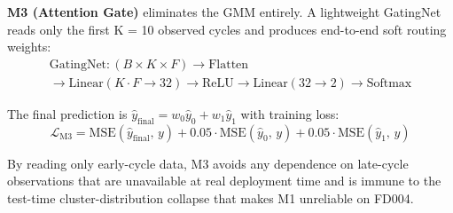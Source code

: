 \documentclass[review,12pt]{elsarticle}
\begin{document}
\textbf{M3 (Attention Gate)} eliminates the GMM entirely. A lightweight GatingNet reads only the first K = 10 observed cycles and produces end-to-end soft routing weights:
\begin{multline}
\text{GatingNet}: (B \times K \times F) \to \text{Flatten} \\
\to \text{Linear}(K{\cdot}F \to 32) \to \text{ReLU} \to \text{Linear}(32 \to 2) \to \text{Softmax}
\end{multline}

The final prediction is $\hat{y}_{\text{final}} = w_0\hat{y}_0 + w_1\hat{y}_1$ with training loss:
\begin{equation}
\mathcal{L}_{\text{M3}} = \text{MSE}(\hat{y}_{\text{final}},\, y) + 0.05\cdot\text{MSE}(\hat{y}_0,\, y) + 0.05\cdot\text{MSE}(\hat{y}_1,\, y)
\end{equation}

By reading only early-cycle data, M3 avoids any dependence on late-cycle observations that are unavailable at real deployment time and is immune to the test-time cluster-distribution collapse that makes M1 unreliable on FD004.


\begin{table}[!t]
\centering
\small
\caption{Computational complexity of H3 architectures (FD003, $F$ = 15 features)}
\label{tab:ii}
\end{table}
\end{document}

